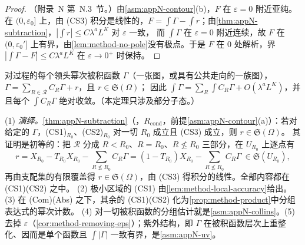 \begin{proof}
（附录~N 第~N.3~节。）由\cref{asm:appN-contour}(b)，$F$ 在 $\varepsilon=0$ 附近亚纯。在 $(0,\varepsilon_0]$ 上，由 (CS3) 积分是线性的，$F=\int\Gamma-\int r$；由\cref{thm:appN-subtraction}，$|\int r|\le C\lambda^aL^K$ 对 $\varepsilon$ 一致，
而 $\int\Gamma$ 在 $\varepsilon=0$ 附近连续，故 $F$ 在 $(0,\varepsilon_0']$ 上有界，由\cref{lem:method-no-pole}没有极点。于是 $F$ 在 $0$ 处解析，界 $|\int\Gamma-F|\le C\lambda^aL^K$ 在 $\varepsilon\to0^+$ 时保持。
\end{proof}

\begin{theorem}\label{thm:method-subtraction}
对过程的每个领头幂次被积函数 $\Gamma$（一张图，或具有公共走向的一族图），$\Gamma=\sum_{R\in\mathcal R}C_R\Gamma+r$，且 $r\in\mathfrak S(\Omega)$；
因此 $\int\Gamma=\sum_R\int C_R\Gamma+O(\lambda^aL^K)$，并且每个 $\int C_R\Gamma$ 绝对收敛。（本定理只涉及部分子态。）
\end{theorem}

\begin{proofsketch}
(1) \emph{演绎。}\cref{thm:appN-subtraction}（\tagR，$R_{\mathrm{cond}}$，前提\cref{asm:appN-contour}(a)）：若对给定的 $\Gamma$，(CS1)$_{R_0}$、(CS2)$_{R_0}$ 对一切 $R_0$ 成立且 (CS3) 成立，则 $r\in\mathfrak S(\Omega)$。
其证明是初等的：把 $\mathcal R$ 分成 $R<R_0$、$R=R_0$、$R\not\le R_0$ 三部分，在 $U_{R_0}$ 上逐点有
\begin{equation}\label{eq:method-r-identity}
r=X_{R_0}-T_{R_0}X_{R_0}-\sum_{R\not\le R_0}C_R\Gamma=(1-T_{R_0})X_{R_0}-\sum_{R\not\le R_0}C_R\Gamma\ \in\mathfrak S(U_{R_0}) ,
\end{equation}
再由支配集的有限覆盖得 $r\in\mathfrak S(\Omega)$，由 (CS3) 得积分的线性。全部内容都在 (CS1)(CS2) 之中。
(2) 极小区域的 (CS1) 由\cref{lem:method-local-accuracy}给出。(3) 在 (Com)(Abs) 之下，其余的 (CS1)(CS2) 化为\cref{prop:method-product}中分组表达式的幂次计数。
(4) 对一切被积函数的分组估计就是\cref{asm:appN-collins}。(5) 去掉 $\varepsilon$（\cref{cor:method-removing-eps}）；紫外结构，即 $\Gamma$ 在被积函数层次上重整化、因而是单个函数且 $\int|\Gamma|$ 一致有界，是\cref{asm:appN-uv}。
\end{proofsketch}

